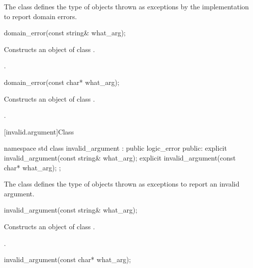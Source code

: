 \pnum
The class
defines the type of objects thrown as
exceptions by the implementation to report domain errors.

%
\begin{itemdecl}
domain_error(const string& what_arg);
\end{itemdecl}

\begin{itemdescr}
\pnum
\effects
Constructs an object of class
.

\pnum
\postcondition
{}.
\end{itemdescr}

%
\begin{itemdecl}
domain_error(const char* what_arg);
\end{itemdecl}

\begin{itemdescr}
\pnum
\effects
Constructs an object of class
.

\pnum
\postcondition
{}.
\end{itemdescr}

[invalid.argument]{Class }

%
\begin{codeblock}
namespace std {
  class invalid_argument : public logic_error {
  public:
    explicit invalid_argument(const string& what_arg);
    explicit invalid_argument(const char* what_arg);
  };
}
\end{codeblock}

\pnum
The class
defines the type of objects thrown as exceptions to report an invalid argument.

%
\begin{itemdecl}
invalid_argument(const string& what_arg);
\end{itemdecl}

\begin{itemdescr}
\pnum
\effects
Constructs an object of class
.

\pnum
\postcondition
{}.
\end{itemdescr}

%
\begin{itemdecl}
invalid_argument(const char* what_arg);
\end{itemdecl}

